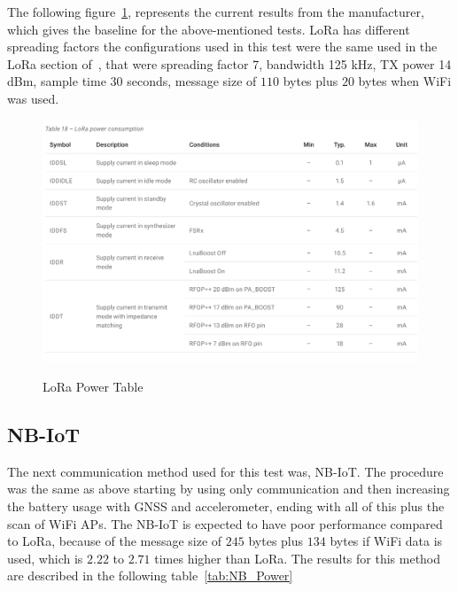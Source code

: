The following figure~\ref{fig:LoRaPowerTable}, represents the current results from the manufacturer, which gives the baseline for the above-mentioned tests. LoRa has different spreading factors the configurations used in this test were the same used in the LoRa section of~, that were spreading factor 7, bandwidth 125 kHz, TX power 14 dBm, sample time 30 seconds, message size of $110$ bytes plus $20$ bytes when WiFi was used.

\begin{figure}[htbp]
  \centering
  
    {\includegraphics[width=\linewidth]{Chapters/Figures/Lora2.PNG}}%
 
  \caption{LoRa Power Table~\cite{Microcontroller2017}}
  \label{fig:LoRaPowerTable}
\end{figure}

\subsection{NB-IoT}
\label{subsec:NB} 

The next communication method used for this test was, NB-IoT. The procedure was the same as above starting by using only communication and then increasing the battery usage with GNSS and accelerometer, ending with all of this plus the scan of WiFi APs. The NB-IoT is expected to have poor performance compared to LoRa, because of the message size of $245$ bytes plus $134$ bytes if WiFi data is used, which is $2.22$ to $2.71$ times higher than LoRa. The results for this method are described in the following table~\ref{tab:NB_Power}

